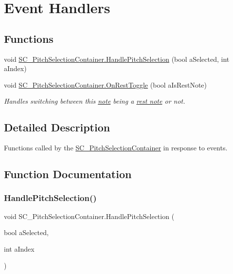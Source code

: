 \hypertarget{group___s_c___p_s_c_handlers}{}\section{Event Handlers}
\label{group___s_c___p_s_c_handlers}
\subsection*{Functions}
\begin{DoxyCompactItemize}
\item 
void \hyperlink{group___s_c___p_s_c_handlers_gaa2afa8167100515d412cf751d9334f0c}{S\+C\+\_\+\+Pitch\+Selection\+Container.\+Handle\+Pitch\+Selection} (bool a\+Selected, int a\+Index)
\item 
void \hyperlink{group___s_c___p_s_c_handlers_ga8715b5976fdae2c56e05a60832553864}{S\+C\+\_\+\+Pitch\+Selection\+Container.\+On\+Rest\+Toggle} (bool a\+Is\+Rest\+Note)
\begin{DoxyCompactList}\small\item\em Handles switching between this \hyperlink{group___music_structs_struct_music_1_1_combined_note}{note} being a \hyperlink{group___doc_s_c___p_s_c_DocSC_PSCRest}{rest note} or not. \end{DoxyCompactList}\end{DoxyCompactItemize}


\subsection{Detailed Description}
Functions called by the \hyperlink{class_s_c___pitch_selection_container}{S\+C\+\_\+\+Pitch\+Selection\+Container} in response to events. 

\subsection{Function Documentation}
\mbox{\label{group___s_c___p_s_c_handlers_gaa2afa8167100515d412cf751d9334f0c}} 
\subsubsection{\texorpdfstring{Handle\+Pitch\+Selection()}{HandlePitchSelection()}}
{\footnotesize\ttfamily void S\+C\+\_\+\+Pitch\+Selection\+Container.\+Handle\+Pitch\+Selection (\begin{DoxyParamCaption}\item[{bool}]{a\+Selected,  }\item[{int}]{a\+Index }\end{DoxyParamCaption})}


